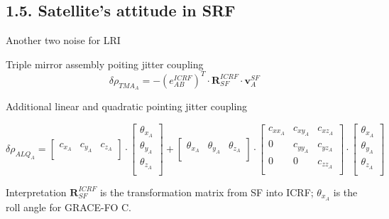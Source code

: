 \documentclass[12pt,english,ignorenonframetext,]{beamer}
\begin{document}
\subsection{\hfill{}1.5. Satellite's attitude in SRF \hfill{}}
\begin{frame}{Another two noise for LRI}
	\begin{block}{Triple mirror assembly poiting jitter coupling}
		\begin{equation}
			\delta \rho_{T M A_{A}}=-\left(e_{A B}^{I C R F}\right)^{T} \cdot \mathbf{R}_{S F}^{I C R F} \cdot \boldsymbol{v}_{A}^{S F}
		\end{equation}
	\end{block}
	\begin{block}{Additional linear and quadratic pointing jitter coupling}
		\begin{tiny}
		\begin{equation}
		 \delta \rho _{ALQ_A}=\left[ \begin{matrix}
		 c_{x_A}&		c_{y_A}&		c_{z_A}\\
		 \end{matrix} \right] \cdot \left[ \begin{array}{c}
		 \theta _{x_A}\\
		 \theta _{y_A}\\
		 \theta _{z_A}\\
		 \end{array} \right] +\left[ \begin{matrix}
		 \theta _{x_A}&		\theta _{y_A}&		\theta _{z_A}\\
		 \end{matrix} \right] \cdot \left[ \begin{matrix}
		 c_{xx_A}&		c_{xy_A}&		c_{xz_A}\\
		 0&		c_{yy_A}&		c_{yz_A}\\
		 0&		0&		c_{zz_A}\\
		 \end{matrix} \right] \cdot \left[ \begin{array}{c}
		 \theta _{x_A}\\
		 \theta _{y_A}\\
		 \theta _{z_A}\\
		 \end{array} \right] 
		\end{equation}
		\end{tiny}
	\end{block}

	\begin{block}{Interpretation}
		$\mathbf{R}_{S F}^{I C R F}$  is the transformation matrix from SF into ICRF; $\theta _{x_A}$ is the roll angle for GRACE-FO C.
	\end{block}
\end{frame}
\end{document}
